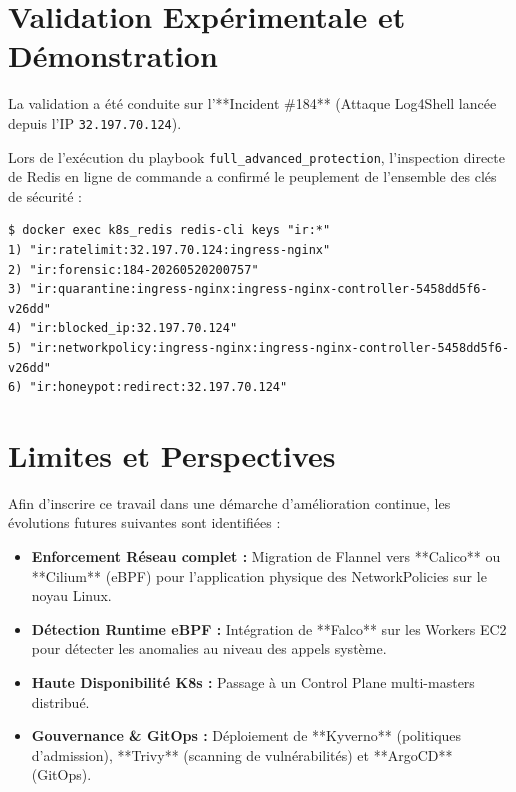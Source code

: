 \documentclass[12pt,a4paper]{report}
\begin{document}
\chapter{Validation Expérimentale et Démonstration}
La validation a été conduite sur l'**Incident \#184** (Attaque Log4Shell lancée depuis l'IP \texttt{32.197.70.124}). 

Lors de l'exécution du playbook \texttt{full\_advanced\_protection}, l'inspection directe de Redis en ligne de commande a confirmé le peuplement de l'ensemble des clés de sécurité :

\begin{lstlisting}[caption={Vérification CLI Redis confirmant l'exécution des mitigations du Playbook}]
$ docker exec k8s_redis redis-cli keys "ir:*"
1) "ir:ratelimit:32.197.70.124:ingress-nginx"
2) "ir:forensic:184-20260520200757"
3) "ir:quarantine:ingress-nginx:ingress-nginx-controller-5458dd5f6-v26dd"
4) "ir:blocked_ip:32.197.70.124"
5) "ir:networkpolicy:ingress-nginx:ingress-nginx-controller-5458dd5f6-v26dd"
6) "ir:honeypot:redirect:32.197.70.124"
\end{lstlisting}

\chapter{Limites et Perspectives}
Afin d'inscrire ce travail dans une démarche d'amélioration continue, les évolutions futures suivantes sont identifiées :
\begin{itemize}
    \item \textbf{Enforcement Réseau complet :} Migration de Flannel vers **Calico** ou **Cilium** (eBPF) pour l'application physique des NetworkPolicies sur le noyau Linux.
    \item \textbf{Détection Runtime eBPF :} Intégration de **Falco** sur les Workers EC2 pour détecter les anomalies au niveau des appels système.
    \item \textbf{Haute Disponibilité K8s :} Passage à un Control Plane multi-masters distribué.
    \item \textbf{Gouvernance \& GitOps :} Déploiement de **Kyverno** (politiques d'admission), **Trivy** (scanning de vulnérabilités) et **ArgoCD** (GitOps).
\end{itemize}

\end{document}
